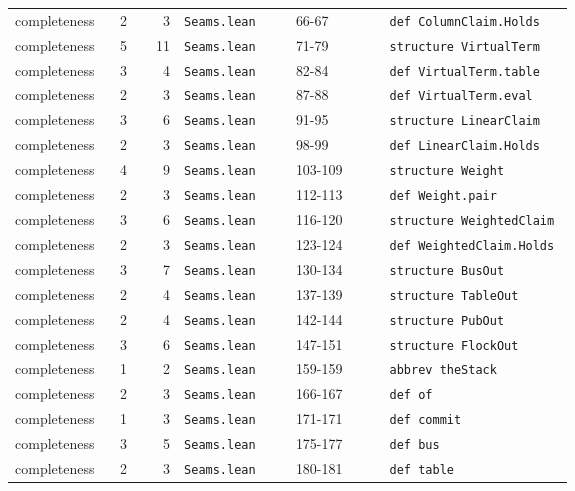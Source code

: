 {\begin{longtable}{@{}>{\raggedright\arraybackslash}p{0.12\linewidth}rr>{\raggedright\arraybackslash}p{0.2\linewidth}l>{\raggedright\arraybackslash}p{0.33\linewidth}@{}}
completeness & 2 & 3 & \texttt{Seams.\allowbreak{}lean} & 66-67 & \texttt{def ColumnClaim.\allowbreak{}Holds} \\
completeness & 5 & 11 & \texttt{Seams.\allowbreak{}lean} & 71-79 & \texttt{structure VirtualTerm} \\
completeness & 3 & 4 & \texttt{Seams.\allowbreak{}lean} & 82-84 & \texttt{def VirtualTerm.\allowbreak{}table} \\
completeness & 2 & 3 & \texttt{Seams.\allowbreak{}lean} & 87-88 & \texttt{def VirtualTerm.\allowbreak{}eval} \\
completeness & 3 & 6 & \texttt{Seams.\allowbreak{}lean} & 91-95 & \texttt{structure LinearClaim} \\
completeness & 2 & 3 & \texttt{Seams.\allowbreak{}lean} & 98-99 & \texttt{def LinearClaim.\allowbreak{}Holds} \\
completeness & 4 & 9 & \texttt{Seams.\allowbreak{}lean} & 103-109 & \texttt{structure Weight} \\
completeness & 2 & 3 & \texttt{Seams.\allowbreak{}lean} & 112-113 & \texttt{def Weight.\allowbreak{}pair} \\
completeness & 3 & 6 & \texttt{Seams.\allowbreak{}lean} & 116-120 & \texttt{structure WeightedClaim} \\
completeness & 2 & 3 & \texttt{Seams.\allowbreak{}lean} & 123-124 & \texttt{def WeightedClaim.\allowbreak{}Holds} \\
completeness & 3 & 7 & \texttt{Seams.\allowbreak{}lean} & 130-134 & \texttt{structure BusOut} \\
completeness & 2 & 4 & \texttt{Seams.\allowbreak{}lean} & 137-139 & \texttt{structure TableOut} \\
completeness & 2 & 4 & \texttt{Seams.\allowbreak{}lean} & 142-144 & \texttt{structure PubOut} \\
completeness & 3 & 6 & \texttt{Seams.\allowbreak{}lean} & 147-151 & \texttt{structure FlockOut} \\
completeness & 1 & 2 & \texttt{Seams.\allowbreak{}lean} & 159-159 & \texttt{abbrev theStack} \\
completeness & 2 & 3 & \texttt{Seams.\allowbreak{}lean} & 166-167 & \texttt{def of} \\
completeness & 1 & 3 & \texttt{Seams.\allowbreak{}lean} & 171-171 & \texttt{def commit} \\
completeness & 3 & 5 & \texttt{Seams.\allowbreak{}lean} & 175-177 & \texttt{def bus} \\
completeness & 2 & 3 & \texttt{Seams.\allowbreak{}lean} & 180-181 & \texttt{def table} \\

\end{longtable}}
